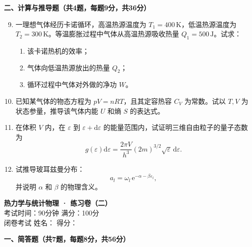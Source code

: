 \documentclass[12pt,a4paper,fontset=mac]{ctexart}
\newcommand{\ee}{\mathrm{e}}
\newcommand{\dd}{\mathrm{d}}
\newcommand{\đ}{\mathrm{đ}}
\newcommand{\calcanswer}{\vspace{8.5cm}}
\begin{document}
\noindent\textbf{二、计算与推导题（共4题，每题9分，共36分）}

\begin{enumerate}
\setcounter{enumi}{8}
\item 一理想气体经历卡诺循环，高温热源温度为 $T_1 = 400\,\text{K}$，低温热源温度为 $T_2 = 300\,\text{K}$。等温膨胀过程中气体从高温热源吸收热量 $Q_1 = 500\,\text{J}$。试求：
\begin{enumerate}
\item 该卡诺热机的效率；
\item 气体向低温热源放出的热量 $Q_2$；
\item 循环过程中气体对外做的净功 $W$。
\end{enumerate}
\calcanswer

\item 已知某气体的物态方程为 $pV = nRT$，且其定容热容 $C_V$ 为常数。试以 $T,V$ 为状态参量，推导该气体内能 $U$ 和熵 $S$ 的表达式。
\calcanswer

\item 在体积 $V$ 内，在 $\varepsilon$ 到 $\varepsilon + \dd\varepsilon$ 的能量范围内，试证明三维自由粒子的量子态数为
\[
g(\varepsilon)\dd\varepsilon = \frac{2\pi V}{h^3}(2m)^{3/2}\sqrt{\varepsilon}\,\dd\varepsilon .
\]
\calcanswer

\item 试推导玻耳兹曼分布：
\[
a_l = \omega_l\,\ee^{-\alpha - \beta\varepsilon_l},
\]
并说明 $\alpha$ 和 $\beta$ 的物理含义。
\calcanswer

\end{enumerate}

\newpage

\begin{center}
{\LARGE \textbf{热力学与统计物理 · 练习卷（二）}}\\[0.5em]
{\large 考试时间：90分钟 \quad 满分：100分}\\[0.3em]
{\normalsize 闭卷考试 \quad 姓名：\underline{\hspace{3cm}} \quad 得分：\underline{\hspace{2cm}}}
\end{center}

\vspace{0.5em}

\noindent\textbf{一、简答题（共7题，每题8分，共56分）}
\end{document}

